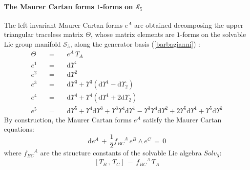 \documentclass[10pt,a4paper]{article}
\newcommand{\ft}[2]{{\textstyle\frac{#1}{#2}}}
\begin{document}
\paragraph{The Maurer Cartan forms $1$-forms on $\mathcal{S}_5$}
The left-invariant Maurer Cartan forms $e^A$ are obtained decomposing the upper triangular traceless matrix $\Theta$, whose matrix elements are $1$-forms on the solvable Lie group manifold $\mathcal{S}_5$, along the generator basis (\ref{barbagianni}) :
\begin{eqnarray}\label{mcformi}
  \Theta & \quad = \quad & e^A \, T_A \nonumber\\
  e^1 &\quad = \quad &  \mathrm{d}\Upsilon^1  \nonumber\\
  e^2 &\quad = \quad & \mathrm{d}\Upsilon^2  \nonumber\\
  e^3 &\quad = \quad &  \mathrm{d}\Upsilon^3 +\Upsilon^3 (\mathrm{d}\Upsilon^1 -\mathrm{d}\Upsilon
   _2 ) \nonumber\\
  e^4 &\quad = \quad&  \mathrm{d}\Upsilon^4 +\Upsilon^4 (\mathrm{d}\Upsilon^1 +2 \mathrm{d}\Upsilon
   _2 ) \nonumber\\
  e^5 &\quad = \quad & \mathrm{d}\Upsilon^5 +\Upsilon^4 \mathrm{d}\Upsilon^3 +\Upsilon^3
   \Upsilon^4 \mathrm{d}\Upsilon^1 -\Upsilon^3 \Upsilon^4
   \mathrm{d}\Upsilon^2 +2 \Upsilon^5 \mathrm{d}\Upsilon^1 +\Upsilon
   ^5 \mathrm{d}\Upsilon^2
\end{eqnarray}
By construction, the Maurer Cartan forms $e^A$ satisfy  the Maurer Cartan equations:
\begin{equation}\label{Maurocarto}
  \mathrm{d}e^A\,+\,\ft 12 f^{\phantom{BC}A}_{BC} \, e^B \wedge e^C \, = \, 0
\end{equation}
where $f^{\phantom{BC}A}_{BC}$ are the structure constants of the solvable Lie algebra $Solv_5$:
\begin{equation}\label{ciamblocca}
  \left[ T_B \, ,\, T_C\right] \, = \, f^{\phantom{BC}A}_{BC} \, T_A
\end{equation}
\end{document}
